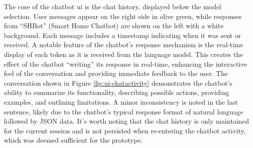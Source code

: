 The core of the chatbot \gls{ui} is the chat history, displayed below the model selection. User messages appear on the right side in olive green, while responses from ``SHBot'' (Smart Home Chatbot) are shown on the left with a white background. Each message includes a timestamp indicating when it was sent or received.
A notable feature of the chatbot's response mechanism is the real-time display of each token as it is received from the language model. This creates the effect of the chatbot ``writing'' its response in real-time, enhancing the interactive feel of the conversation and providing immediate feedback to the user.
The conversation shown in Figure \ref{fig:ui-chatactivity} demonstrates the chatbot's ability to summarize its functionality, describing possible actions, providing examples, and outlining limitations. A minor inconsistency is noted in the last sentence, likely due to the chatbot's typical response format of natural language followed by JSON data.
It's worth noting that the chat history is only maintained for the current session and is not persisted when re-entering the chatbot activity, which was deemed sufficient for the prototype.

